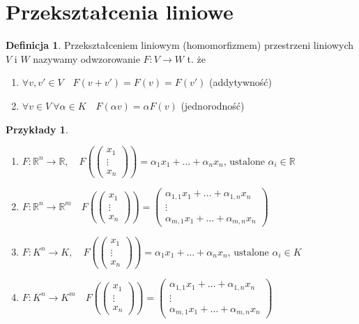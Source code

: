 \documentclass[12pt,a4paper]{article}
\newcommand{\RR}{\mathbb{R}}
\theoremstyle{plain}
\theoremstyle{definition}
\theoremstyle{definition}
\newtheorem{df}{Definicja}[section]
\theoremstyle{definition}
\theoremstyle{definition}
\theoremstyle{definition}
\theoremstyle{definition}
\theoremstyle{definition}
\newtheorem*{przy}{Przykłady}
\theoremstyle{definition}
\theoremstyle{definition}
\begin{document}
\section{Przekształcenia liniowe} 
\begin{df}
    Przekształceniem liniowym (homomorfizmem) przestrzeni liniowych $V \text{ i } W$ nazywamy odwzorowanie $F: V \rightarrow W$ t. że
    \begin{enumerate}[{(}1{)}]
        \item $\forall v, v' \in V \quad F(v+v') = F(v) = F(v')$ (addytywność) 
        \item $\forall v \in V \ \forall \alpha \in K \quad F(\alpha v) = \alpha F(v)$ (jednorodność)
    \end{enumerate}
\end{df}

\begin{przy}
    \hfill
    \begin{enumerate}[{(}1{)}]
        \item $F: \RR^n \rightarrow \RR, \quad F \left( \begin{pmatrix} x_1 \\ \vdots \\ x_n \end{pmatrix}\right) = \alpha_1 x_1 + \dots + \alpha_n x_n \text{, ustalone } \alpha_i \in \RR$ 
        \item $F: \RR^n \rightarrow \RR^m  \quad F \left( \begin{pmatrix} x_1 \\ \vdots \\ x_n \end{pmatrix}\right) = \begin{pmatrix} \alpha_{1,1}x_1 + \dots + \alpha_{1,n} x_n\\ \vdots \\ \alpha_{m,1}x_1 + \dots + \alpha_{m,n} x_n \end{pmatrix}$
        \item $F: K^n \rightarrow K, \quad F \left( \begin{pmatrix} x_1 \\ \vdots \\ x_n \end{pmatrix}\right) = \alpha_1 x_1 + \dots + \alpha_n x_n \text{, ustalone } \alpha_i \in K$ 
        \item $F: K^n \rightarrow K^m  \quad F \left( \begin{pmatrix} x_1 \\ \vdots \\ x_n \end{pmatrix}\right) = \begin{pmatrix} \alpha_{1,1}x_1 + \dots + \alpha_{1,n} x_n\\ \vdots \\ \alpha_{m,1}x_1 + \dots + \alpha_{m,n} x_n \end{pmatrix}$

\end{enumerate}
\end{przy}
\end{document}

